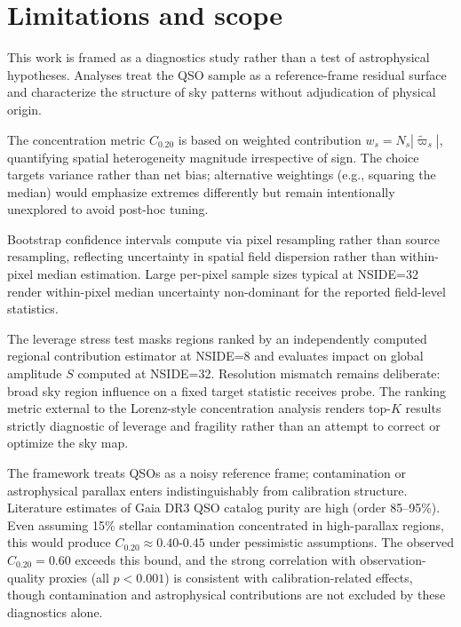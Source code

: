 \documentclass{aa}
\begin{document}
\section{Limitations and scope}

This work is framed as a diagnostics study rather than a test of astrophysical hypotheses. Analyses treat the QSO sample as a reference-frame residual surface and characterize the structure of sky patterns without adjudication of physical origin.

The concentration metric $C_{0.20}$ is based on weighted contribution $w_s = N_s |\tilde{\varpi}_s|$, quantifying spatial heterogeneity magnitude irrespective of sign. The choice targets variance rather than net bias; alternative weightings (e.g., squaring the median) would emphasize extremes differently but remain intentionally unexplored to avoid post-hoc tuning.

Bootstrap confidence intervals compute via pixel resampling rather than source resampling, reflecting uncertainty in spatial field dispersion rather than within-pixel median estimation. Large per-pixel sample sizes typical at NSIDE=32 render within-pixel median uncertainty non-dominant for the reported field-level statistics.

The leverage stress test masks regions ranked by an independently computed regional contribution estimator at NSIDE=8 and evaluates impact on global amplitude $S$ computed at NSIDE=32. Resolution mismatch remains deliberate: broad sky region influence on a fixed target statistic receives probe. The ranking metric external to the Lorenz-style concentration analysis renders top-$K$ results strictly diagnostic of leverage and fragility rather than an attempt to correct or optimize the sky map.

The framework treats QSOs as a noisy reference frame; contamination or astrophysical parallax enters indistinguishably from calibration structure. Literature estimates of Gaia DR3 QSO catalog purity are high (order 85--95\%). Even assuming 15\% stellar contamination concentrated in high-parallax regions, this would produce $C_{0.20} \approx 0.40$-$0.45$ under pessimistic assumptions. The observed $C_{0.20} = 0.60$ exceeds this bound, and the strong correlation with observation-quality proxies (all $p < 0.001$) is consistent with calibration-related effects, though contamination and astrophysical contributions are not excluded by these diagnostics alone.

\end{document}
